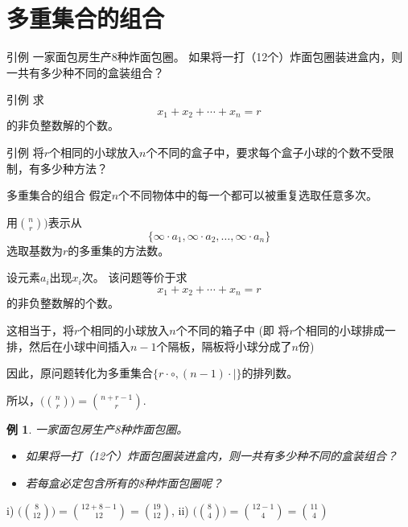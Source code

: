 \documentclass[13pt, punct]{ctexbeamer}
\newtheorem{ex}{例}[section]
\begin{document}
\section{多重集合的组合}


\begin{frame}
\begin{block}{引例}
    一家面包房生产8种炸面包圈。
如果将一打（12个）炸面包圈装进盒内，则一共有多少种不同的盒装组合？

\end{block}

\begin{block}{引例}
求
$$x_1+x_2+\cdots+x_n=r$$
的非负整数解的个数。
\end{block}

\begin{block}{引例}
将$r$个相同的小球放入$n$个不同的盒子中，要求每个盒子小球的个数不受限制，有多少种方法？
\end{block}

\end{frame}
\begin{frame}{多重集合的组合}
假定$n$个不同物体中的每一个都可以被重复选取任意多次。

用${n\choose
	r}\!\big)$表示从
$$\{\infty \cdot a_1, \infty \cdot a_2, \ldots, \infty \cdot a_n\}$$
选取基数为$r$的多重集的方法数。

设元素$a_i$出现$x_i$次。 该问题等价于求
$$x_1+x_2+\cdots+x_n=r$$
的非负整数解的个数。

这相当于，将$r$个相同的小球放入$n$个不同的箱子中
(即 将$r$个相同的小球排成一排，然后在小球中间插入$n-1$个隔板，隔板将小球分成了$n$份)

因此，原问题转化为多重集合$\{r \cdot \circ, (n-1) \cdot  | \}$的排列数。

所以，$\big(\!{n\choose r}\!\big)={n+r-1\choose r}$.
\end{frame}

\begin{frame}

\begin{ex}
	一家面包房生产8种炸面包圈。
	\begin{itemize}
		\item[i)]如果将一打（12个）炸面包圈装进盒内，则一共有多少种不同的盒装组合？

		\item[ii)] 若每盒必定包含所有的8种炸面包圈呢？
	\end{itemize}
\end{ex}
\pause  \qquad
i)  $\big(\!{8 \choose 12}\!\big)={12+8-1\choose 12}={19\choose 12}$, \qquad
ii) $\big(\!{8 \choose 4}\!\big)={12-1\choose 4}= {11 \choose 4}$
\end{frame}
\end{document}
